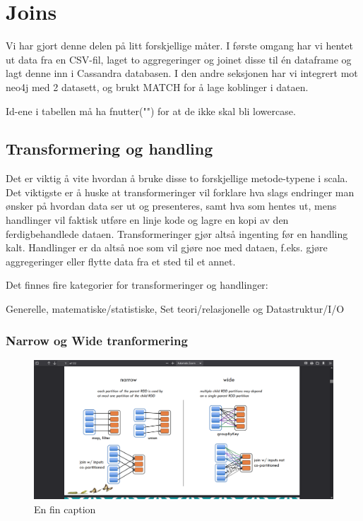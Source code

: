 \section{Joins}
Vi har gjort denne delen på litt forskjellige måter. I første omgang har vi hentet ut data fra en CSV-fil, laget to aggregeringer og joinet disse til én dataframe og lagt denne inn i Cassandra databasen. I den andre seksjonen har vi integrert mot neo4j med 2 datasett, og brukt MATCH for å lage koblinger i dataen.

Id-ene i tabellen må ha fnutter("") for at de ikke skal bli lowercase.


\subsection{Transformering og handling}
Det er viktig å vite hvordan å bruke disse to forskjellige metode-typene i scala. Det viktigste er å huske at transformeringer vil forklare hva slags endringer man ønsker på hvordan data ser ut og presenteres, samt hva som hentes ut, mens handlinger vil faktisk utføre en linje kode og lagre en kopi av den ferdigbehandlede dataen. Transformeringer gjør altså ingenting før en handling kalt. Handlinger er da altså noe som vil gjøre noe med dataen, f.eks. gjøre aggregeringer eller flytte data fra et sted til et annet.

Det finnes fire kategorier for transformeringer og handlinger:

Generelle, matematiske/statistiske, Set teori/relasjonelle og Datastruktur/I/O

\subsubsection{Narrow og Wide tranformering}

\begin{figure}[H]
    \centering
    \includegraphics[scale=0.3]{images/transformActionPic.png}
    \caption{En fin caption}
\end{figure}

